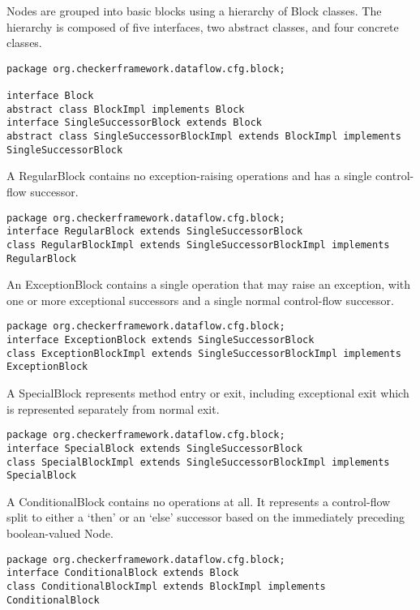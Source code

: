 Nodes are grouped into basic blocks using a hierarchy of Block
classes.  The hierarchy is composed of five interfaces, two abstract
classes, and four concrete classes.

\begin{verbatim}
package org.checkerframework.dataflow.cfg.block;

interface Block
abstract class BlockImpl implements Block
interface SingleSuccessorBlock extends Block
abstract class SingleSuccessorBlockImpl extends BlockImpl implements SingleSuccessorBlock
\end{verbatim}

A RegularBlock contains no exception-raising operations and has a
single control-flow successor.

\begin{verbatim}
package org.checkerframework.dataflow.cfg.block;
interface RegularBlock extends SingleSuccessorBlock
class RegularBlockImpl extends SingleSuccessorBlockImpl implements RegularBlock
\end{verbatim}

An ExceptionBlock contains a single operation that may raise an
exception, with one or more exceptional successors and a single normal
control-flow successor.

\begin{verbatim}
package org.checkerframework.dataflow.cfg.block;
interface ExceptionBlock extends SingleSuccessorBlock
class ExceptionBlockImpl extends SingleSuccessorBlockImpl implements ExceptionBlock
\end{verbatim}

A SpecialBlock represents method entry or exit, including exceptional
exit which is represented separately from normal exit.

\begin{verbatim}
package org.checkerframework.dataflow.cfg.block;
interface SpecialBlock extends SingleSuccessorBlock
class SpecialBlockImpl extends SingleSuccessorBlockImpl implements SpecialBlock
\end{verbatim}

A ConditionalBlock contains no operations at all.  It represents a
control-flow split to either a `then' or an `else' successor based on
the immediately preceding boolean-valued Node.

\begin{verbatim}
package org.checkerframework.dataflow.cfg.block;
interface ConditionalBlock extends Block
class ConditionalBlockImpl extends BlockImpl implements ConditionalBlock
\end{verbatim}



